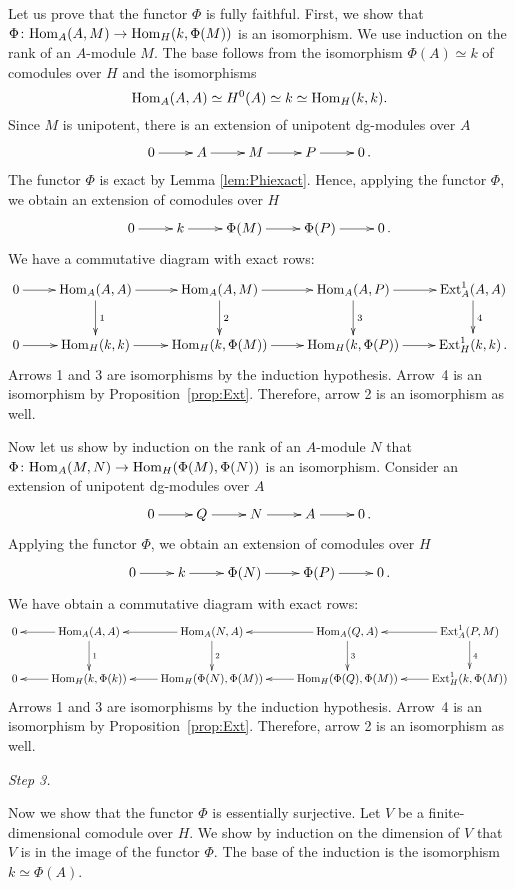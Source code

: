 \documentclass[10pt,russian]{article}
\theoremstyle{plain}
\theoremstyle{definition}
\newcommand{\Hom}{{\rm Hom}}
\newcommand{\Ext}{{\rm Ext}}
\begin{document}
Let us prove that the functor $\Phi$ is fully faithful. First, we show that $\Phi\colon \Hom_{A}(A, M) \to \Hom_H(k, \Phi(M))$ is an isomorphism. We use induction on the rank of an $A$-module $M$. The base follows from the isomorphism $\Phi(A)\simeq k$ of comodules over $H$ and the isomorphisms
$$
\Hom_A(A,A) \simeq H^0(A) \simeq k \simeq \Hom_H(k, k).
$$
Since $M$ is unipotent, there is an extension of unipotent dg-modules over $A$
$$
\xymatrix{
	0 \ar[r] & A \ar[r] & M \ar[r] & P \ar[r] & 0\,.
}
$$
The functor $\Phi$ is exact by Lemma \ref{lem:Phiexact}. Hence, applying the functor $\Phi$, we obtain an extension of comodules over $H$
$$
\xymatrix{
	0 \ar[r] & k \ar[r] & \Phi(M) \ar[r] & \Phi(P) \ar[r] & 0\,.
}
$$
We have a commutative diagram with exact rows:
$$
\xymatrix{
	 0 \ar[r] & \Hom_{A}(A, A) \ar[r] \ar[d]^1 & \Hom_A(A, M) \ar[r] \ar[d]^2 & \Hom_A(A, P) \ar[d]^3 \ar[r] & \Ext^1_A(A, A)  \ar[d]^4 \\
	0 \ar[r] & \Hom_{H}(k, k) \ar[r] & \Hom_H(k, \Phi(M)) \ar[r] & \Hom_{H}(k, \Phi(P)) \ar[r] & \Ext^1_{H}(k, k)\,.
}
$$
Arrows 1 and 3 are isomorphisms by the induction hypothesis. Arrow~4 is an isomorphism by Proposition~\ref{prop:Ext}. Therefore, arrow 2 is an isomorphism as well.

Now let us show by induction on the rank of an $A$-module $N$ that ${\Phi\colon\Hom_A(M,N)\to\Hom_H(\Phi(M),\Phi(N))}$ is an isomorphism. Consider an extension of unipotent dg-modules over $A$
$$
\xymatrix{
0 \ar[r] & Q^{} \ar[r] & N^{} \ar[r] & A^{} \ar[r] & 0\,.
}
$$
Applying the functor $\Phi$, we obtain an extension of comodules over $H$
$$
\xymatrix{
	0 \ar[r] & k \ar[r] & \Phi(N) \ar[r] & \Phi(P) \ar[r] & 0\,.
}
$$
We have obtain a commutative diagram with exact rows:
$$
\xymatrix{
	0 & \Hom_{A}(A, A) \ar[l] \ar[d]^1 & \Hom_A(N, A) \ar[l] \ar[d]^2 & \Hom_A(Q,A) \ar[d]^3 \ar[l] & \Ext^1_A(P, M ) \ar[d]^4 \ar[l]\\
	0 & \Hom_{H}(k, \Phi(k)) \ar[l] & \Hom_H(\Phi(N), \Phi(M)) \ar[l] & \Hom_{H}(\Phi(Q), \Phi(M)) \ar[l]& \Ext^1_{H}(k, \Phi(M)) \ar[l]
}
$$
Arrows 1 and 3 are isomorphisms by the induction hypothesis. Arrow~4 is an isomorphism by Proposition~\ref{prop:Ext}. Therefore, arrow 2 is an isomorphism as well. \medskip

{\it Step 3.}

Now we show that the functor $\Phi$ is essentially surjective. Let $V$ be a finite-dimensional comodule over $H$. We show by induction on the dimension of $V$ that $V$ is in the image of the functor $\Phi$. The base of the induction is the isomorphism $k\simeq\Phi(A)$.
\end{document}
